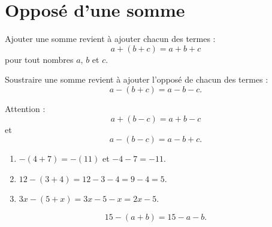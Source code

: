 
\section{Opposé d'une somme}






\begin{Aretenir}

    Ajouter une somme revient à ajouter chacun des termes :
    \begin{equation}
        a+(b+c)=a+b+c
    \end{equation}
    pour tout nombres \( a\), \( b\) et \( c\).

    Soustraire une somme revient à ajouter l'opposé de chacun des termes :
    \begin{equation}
        a-(b+c)=a-b-c.
    \end{equation}
\end{Aretenir}

Attention : 
\begin{equation}
        a+(b-c)=a+b-c
\end{equation}
et
\begin{equation}
    a-(b-c)=a-b+c.
\end{equation}


\begin{example}
    \begin{enumerate}
        \item
            \( -(4+7)=-(11)\) et \( -4-7=-11\).
        \item
            \( 12-(3+4)=12-3-4=9-4=5\).
        \item
            \( 3x-(5+x)=3x-5-x=2x-5\).
    \end{enumerate}
\end{example}

\begin{example}
    \begin{equation}
        15-(a+b)=15-a-b.
    \end{equation}
\end{example}

